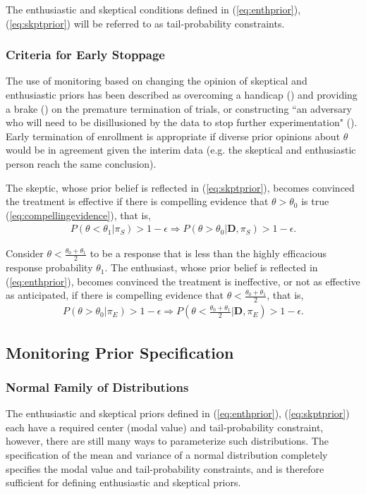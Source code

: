 \documentclass[12pt]{article}
\begin{document}
The enthusiastic and skeptical conditions defined in (\ref{eq:enthprior}), (\ref{eq:skptprior}) will be referred to as tail-probability constraints.

\subsubsection{Criteria for Early Stoppage}
The use of monitoring based on changing the opinion of skeptical and enthusiastic priors has been described as overcoming a handicap (\cite{Freedman1989}) and providing a brake (\cite{Fayers1997}) on the premature termination of trials, or constructing ``an adversary who will need to be disillusioned by the data to stop further experimentation" (\cite{Spiegelhalter1994}). Early termination of enrollment is appropriate if diverse prior opinions about $\theta$ would be in agreement given the interim data (e.g. the skeptical and enthusiastic person reach the same conclusion). 

The skeptic, whose prior belief is reflected in (\ref{eq:skptprior}), becomes convinced the treatment is effective if there is compelling evidence that $\theta>\theta_0$ is true (\ref{eq:compellingevidence}), that is, 
\begin{align}
P(\theta<\theta_1|\pi_{S})>1-\epsilon \Rightarrow P(\theta>\theta_0| \mathbf{D},\pi_{S})>1-\epsilon.
\end{align}

Consider $\theta<\frac{\theta_0+\theta_1}{2}$ to be a response that is less than the highly efficacious response probability $\theta_1$. The enthusiast, whose prior belief is reflected in (\ref{eq:enthprior}), becomes convinced the treatment is ineffective, or not as effective as anticipated, if there is compelling evidence that $\theta<\frac{\theta_0+\theta_1}{2}$, that is, 
\begin{align}
P(\theta>\theta_0|\pi_{E})>1-\epsilon\Rightarrow P\left(\theta<\frac{\theta_0+\theta_1}{2}\Big| \mathbf{D},\pi_{E}\right)>1-\epsilon.
\end{align}
%
\subsection{Monitoring Prior Specification}
\subsubsection{Normal Family of Distributions}
The enthusiastic and skeptical priors defined in (\ref{eq:enthprior}), (\ref{eq:skptprior}) each have a required center (modal value) and tail-probability constraint, however, there are still many ways to parameterize such distributions. The specification of the mean and variance of a normal distribution completely specifies the modal value and tail-probability constraints, and is therefore sufficient for defining enthusiastic and skeptical priors.
\end{document}
